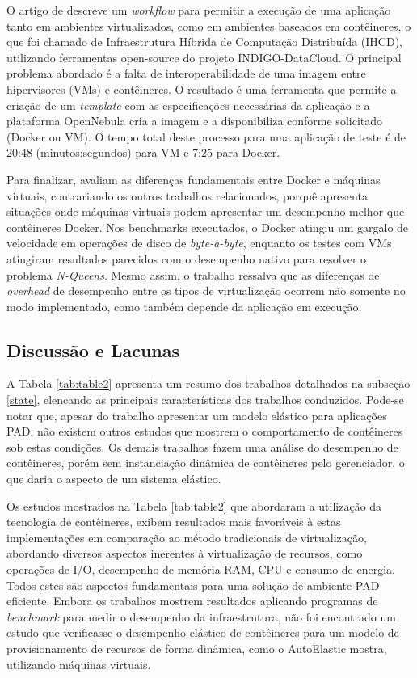 \documentclass[twoside,english,brazilian]{UNISINOSartigo}
\begin{document}
O artigo de  descreve um \textit{workflow} para permitir a execução de uma aplicação tanto em ambientes virtualizados, como em ambientes baseados em contêineres, o que foi chamado de Infraestrutura Híbrida de Computação Distribuída (IHCD), utilizando ferramentas open-source do projeto INDIGO-DataCloud. O principal problema abordado é a falta de interoperabilidade de uma imagem entre hipervisores (VMs) e contêineres. O resultado é uma ferramenta que permite a criação de um \textit{template} com as especificações necessárias da aplicação e a plataforma OpenNebula cria a imagem e a disponibiliza conforme solicitado (Docker ou VM). O tempo total deste processo para uma aplicação de teste é de 20:48 (minutos:segundos) para VM e 7:25 para Docker.

Para finalizar,  avaliam as diferenças fundamentais entre Docker e máquinas virtuais, contrariando os outros trabalhos relacionados, porquê apresenta situações onde máquinas virtuais podem apresentar um desempenho melhor que contêineres Docker. Nos benchmarks executados, o Docker atingiu um gargalo de velocidade em operações de disco de \textit{byte-a-byte}, enquanto os testes com VMs atingiram resultados parecidos com o desempenho nativo para resolver o problema \textit{N-Queens}. Mesmo assim, o trabalho ressalva que as diferenças de \textit{overhead} de desempenho entre os tipos de virtualização ocorrem não somente no modo implementado, como também depende da aplicação em execução. 

\subsection{Discussão e Lacunas}
\label{comparacao}
A Tabela \ref{tab:table2} apresenta um resumo dos trabalhos detalhados na subseção \ref{state}, elencando as principais características dos trabalhos conduzidos. Pode-se notar que, apesar do trabalho  apresentar um modelo elástico para aplicações PAD, não existem outros estudos que mostrem o comportamento de contêineres sob estas condições. Os demais trabalhos fazem uma análise do desempenho de contêineres, porém sem instanciação dinâmica de contêineres pelo gerenciador, o que daria o aspecto de um sistema elástico.

Os estudos mostrados na Tabela \ref{tab:table2} que abordaram a utilização da tecnologia de contêineres, exibem resultados mais favoráveis à estas implementações em comparação ao método tradicionais de virtualização, abordando diversos aspectos inerentes à virtualização de recursos, como operações de I/O, desempenho de memória RAM, CPU e consumo de energia. Todos estes são aspectos fundamentais para uma solução de ambiente PAD eficiente. Embora os trabalhos mostrem resultados aplicando programas de \textit{benchmark} para medir o desempenho da infraestrutura, não foi encontrado um estudo que verificasse o desempenho elástico de contêineres para um modelo de provisionamento de recursos de forma dinâmica, como o AutoElastic mostra, utilizando máquinas virtuais.
\end{document}
